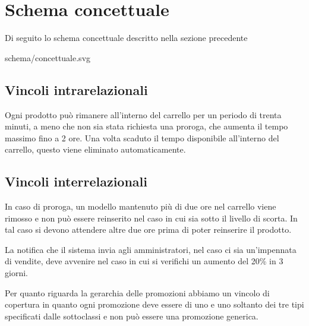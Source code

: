 \section{Schema concettuale}
Di seguito lo schema concettuale descritto nella sezione precedente

\begin{center}
	 {schema/concettuale.svg}
\end{center}

\subsection{Vincoli intrarelazionali}
Ogni prodotto può rimanere all'interno del carrello per un periodo di trenta minuti, a meno che
non sia stata richiesta una proroga, che aumenta il tempo massimo fino a 2 ore. Una volta
scaduto il tempo disponibile all'interno del carrello, questo viene eliminato automaticamente.

\subsection{Vincoli interrelazionali}
In caso di proroga, un modello mantenuto più di due ore nel carrello viene rimosso e non può
essere reinserito nel caso in cui sia sotto il livello di scorta. In tal caso si devono attendere
altre due ore prima di poter reinserire il prodotto.

La notifica che il sistema invia agli amministratori, nel caso ci sia un'impennata di vendite,
deve avvenire nel caso in cui si verifichi un aumento del 20\% in 3 giorni.

Per quanto riguarda la gerarchia delle promozioni abbiamo un vincolo di copertura in quanto ogni
promozione deve essere di uno e uno soltanto dei tre tipi specificati dalle sottoclassi e non può
essere una promozione generica.